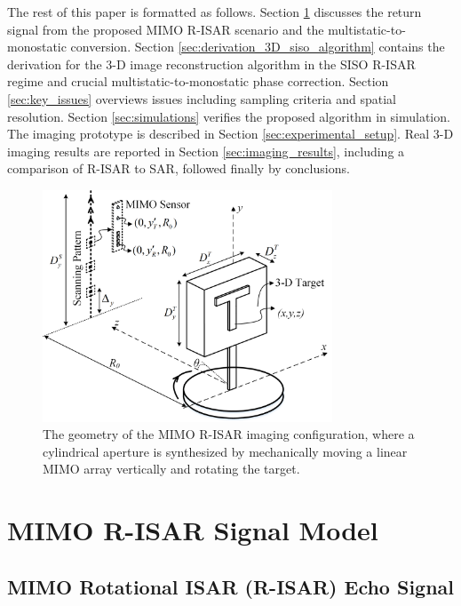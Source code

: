 \documentclass[conference]{IEEEtran}
\begin{document}
		The rest of this paper is formatted as follows. Section \ref{sec:signal_model} discusses the return signal from the  proposed MIMO R-ISAR scenario and the multistatic-to-monostatic conversion. Section \ref{sec:derivation_3D_siso_algorithm} contains the derivation for the 3-D image reconstruction algorithm in the SISO R-ISAR regime and crucial multistatic-to-monostatic phase correction. Section \ref{sec:key_issues} overviews issues including sampling criteria and spatial resolution. Section \ref{sec:simulations} verifies the proposed algorithm in simulation. The imaging prototype is described in Section \ref{sec:experimental_setup}. Real 3-D imaging results are reported in Section \ref{sec:imaging_results}, including a comparison of R-ISAR to SAR, followed finally by conclusions.
		
		\begin{figure}[h]
			\centering
			\includegraphics[width=3.4in]{MIMO_R_ISAR_System_Configuration}
			\caption{The geometry of the MIMO R-ISAR imaging configuration, where a cylindrical aperture is synthesized by mechanically moving a linear MIMO array vertically and rotating the target.}
			\label{fig:MIMO_R_ISAR_System_Configuration}
		\end{figure} 
		
		
		\section{MIMO R-ISAR Signal Model}
		\label{sec:signal_model}
		
		\subsection{MIMO Rotational ISAR (R-ISAR) Echo Signal}
		\label{Sec_mimo_r-isar_signal}
		
\end{document}

